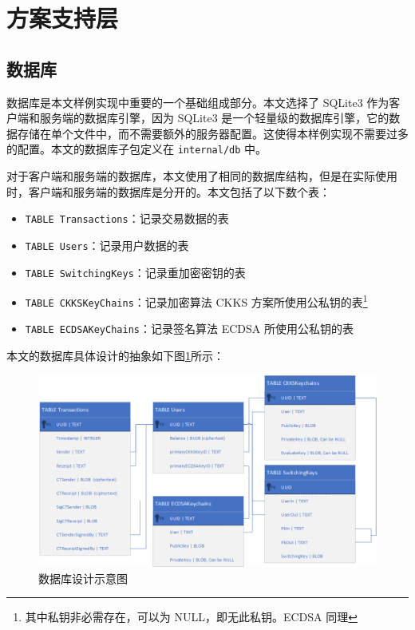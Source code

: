 \section{方案支持层}

\subsection{数据库}

数据库是本文样例实现中重要的一个基础组成部分。本文选择了 SQLite3 作为客户端和服务端的数据库引擎，因为 SQLite3 是一个轻量级的数据库引擎，它的数据存储在单个文件中，而不需要额外的服务器配置。这使得本样例实现不需要过多的配置。本文的数据库子包定义在 \verb|internal/db| 中。

对于客户端和服务端的数据库，本文使用了相同的数据库结构，但是在实际使用时，客户端和服务端的数据库是分开的。本文包括了以下数个表：

\begin{itemize}
    \item \verb|TABLE Transactions|：记录交易数据的表
    \item \verb|TABLE Users|：记录用户数据的表
    \item \verb|TABLE SwitchingKeys|：记录重加密密钥的表
    \item \verb|TABLE CKKSKeyChains|：记录加密算法 CKKS 方案所使用公私钥的表\footnote{其中私钥非必需存在，可以为 NULL，即无此私钥。ECDSA 同理}
    \item \verb|TABLE ECDSAKeyChains|：记录签名算法 ECDSA 所使用公私钥的表
\end{itemize}

本文的数据库具体设计的抽象如下图\ref*{Fig:Database}所示：

\begin{figure}
    \centering
    \includegraphics[width=0.8\linewidth]{Figures/chimata-database-design.png}
    \caption{数据库设计示意图}\label{Fig:Database}
\end{figure}

